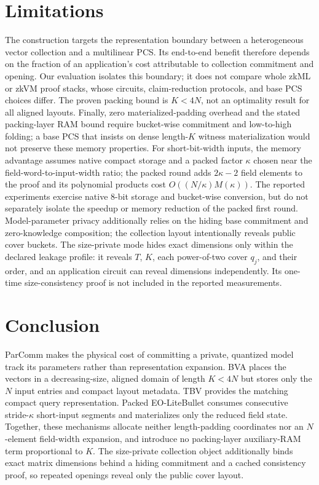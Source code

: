 \documentclass[letterpaper,twocolumn,10pt]{article}
\begin{document}









\section{Limitations}
The construction targets the representation boundary between a heterogeneous
vector collection and a multilinear PCS.  Its end-to-end benefit therefore depends on
the fraction of an application's cost attributable to collection commitment
and opening.  Our evaluation isolates this boundary; it does not compare whole
zkML or zkVM proof stacks, whose circuits, claim-reduction protocols, and base
PCS choices differ.  The proven packing bound is $K<4N$, not an optimality
result for all aligned layouts.  Finally, zero materialized-padding overhead
and the stated packing-layer RAM bound require bucket-wise commitment and
low-to-high folding; a base PCS that insists on dense length-$K$ witness
materialization would not preserve these memory properties.
For short-bit-width inputs, the memory advantage assumes native compact storage
and a packed factor $\kappa$ chosen near the field-word-to-input-width ratio;
the packed round adds $2\kappa-2$ field elements to the proof and its polynomial
products cost $O((N/\kappa)M(\kappa))$.  The reported experiments exercise
native 8-bit storage and bucket-wise conversion, but do not separately isolate
the speedup or memory reduction of the packed first round.  Model-parameter
privacy additionally relies on the hiding base commitment and zero-knowledge
composition; the collection layout intentionally reveals public cover buckets.
The size-private mode hides exact dimensions only within the declared leakage
profile: it reveals $T$, $K$, each power-of-two cover $q_j$, and their order, and
an application circuit can reveal dimensions independently.  Its one-time
size-consistency proof is not included in the reported measurements.

\section{Conclusion}
ParComm makes the physical cost of committing a private, quantized model track
its parameters rather than representation expansion.  BVA places the
vectors in a decreasing-size, aligned domain of length $K<4N$ but stores only
the $N$ input entries and compact layout metadata.  TBV provides the matching
compact query representation.  Packed EO-LiteBullet consumes consecutive
stride-$\kappa$ short-input segments and materializes only the reduced field
state.  Together, these mechanisms allocate neither length-padding coordinates
nor an $N$-element field-width expansion, and introduce no packing-layer
auxiliary-RAM term proportional to $K$.
The size-private collection object additionally binds exact matrix dimensions
behind a hiding commitment and a cached consistency proof, so repeated openings
reveal only the public cover layout.
\end{document}
